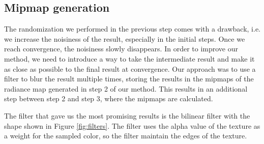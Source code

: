 \FloatBarrier
\subsection{Mipmap generation}
\label{sec:mipmaps}
The randomization we performed in the previous step comes with a drawback, i.e. we increase the noisiness of the result, especially in the initial steps. Once we reach convergence, the noisiness slowly disappears. In order to improve our method, we need to introduce a way to take the intermediate result and make it as close as possible to the final result at convergence. Our approach was to use a filter to blur the result multiple times, storing the results in the mipmaps of the radiance map generated in step 2 of our method. This results in an additional step between step 2 and step 3, where the mipmaps are calculated.

The filter that gave us the most promising results is the bilinear filter with the shape shown in Figure \ref{fig:filters}. The filter uses the alpha value of the texture as a weight for the sampled color, so the filter maintain the edges of the texture. %

